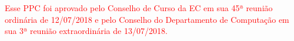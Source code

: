 \textcolor{red}{Esse PPC foi aprovado pelo Conselho de Curso da EC em sua 45ª reunião ordinária de 12/07/2018 e pelo Conselho do Departamento de Computação em sua 3ª reunião extraordinária de 13/07/2018.}







